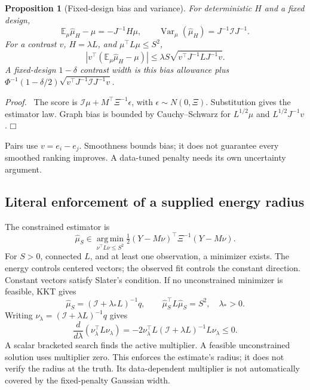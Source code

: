 \documentclass[11pt]{article}
\newtheorem{proposition}[theorem]{Proposition}
\newenvironment{proof}{\par\noindent\textit{Proof.}\ }{\hfill$\mdlgwhtsquare$\par\medskip}
\newcommand{\E}{\mathbb E}
\newcommand{\Var}{\operatorname{Var}}
\newcommand{\argmin}{\operatorname*{arg\,min}}
\begin{document}
\begin{proposition}[Fixed-design bias and variance]
For deterministic $H$ and a fixed design,
\begin{equation}
\E_\mu\widehat\mu_H-\mu=-J^{-1}H\mu,\qquad
\Var_\mu(\widehat\mu_H)=J^{-1}\mathcal I J^{-1}.
\label{eq:bias-var}
\end{equation}
For a contrast $v$, $H=\lambda L$, and $\mu^\top L\mu\le S^2$,
\begin{equation}
|v^\top(\E_\mu\widehat\mu_H-\mu)|
\le\lambda S\sqrt{v^\top J^{-1}LJ^{-1}v}.
\label{eq:bias-bound}
\end{equation}
A fixed-design $1-\delta$ contrast width is this bias allowance plus
$\Phi^{-1}(1-\delta/2)\sqrt{v^\top J^{-1}\mathcal I J^{-1}v}$.
\end{proposition}
\begin{proof}
The score is $\mathcal I\mu+M^\top\Xi^{-1}\epsilon$, with $\epsilon\sim N(0,\Xi)$. Substitution gives the estimator law. Graph bias is bounded by Cauchy--Schwarz for $L^{1/2}\mu$ and $L^{1/2}J^{-1}v$.
\end{proof}
Pairs use $v=e_i-e_j$. Smoothness bounds bias; it does not guarantee every smoothed ranking improves. A data-tuned penalty needs its own uncertainty argument.

\subsection{Literal enforcement of a supplied energy radius}
The constrained estimator is
\begin{equation}
\widehat\mu_S\in\argmin_{\nu^\top L\nu\le S^2}
\tfrac12(Y-M\nu)^\top\Xi^{-1}(Y-M\nu).
\end{equation}
For $S>0$, connected $L$, and at least one observation, a minimizer exists. The energy controls centered vectors; the observed fit controls the constant direction. Constant vectors satisfy Slater's condition. If no unconstrained minimizer is feasible, KKT gives
\begin{equation}
\widehat\mu_S=(\mathcal I+\lambda_*L)^{-1}q,\qquad
\widehat\mu_S^\top L\widehat\mu_S=S^2,\quad\lambda_*>0.
\end{equation}
Writing $\nu_\lambda=(\mathcal I+\lambda L)^{-1}q$ gives
\[
\frac{d}{d\lambda}(\nu_\lambda^\top L\nu_\lambda)
=-2\nu_\lambda^\top L(\mathcal I+\lambda L)^{-1}L\nu_\lambda\le0.
\]
A scalar bracketed search finds the active multiplier. A feasible unconstrained solution uses multiplier zero. This enforces the estimate's radius; it does not verify the radius at the truth. Its data-dependent multiplier is not automatically covered by the fixed-penalty Gaussian width.
\end{document}
